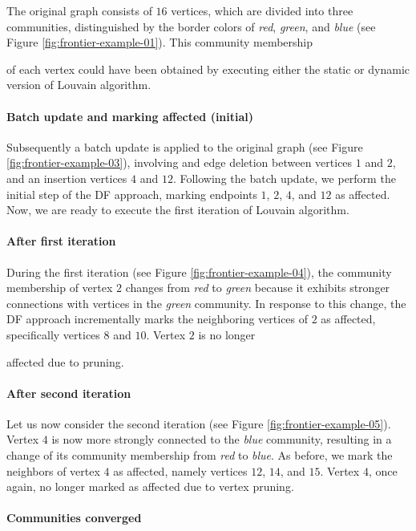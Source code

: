 The original graph consists of $16$ vertices, which are divided into three communities, distinguished by the border colors of \textit{red}, \textit{green}, and \textit{blue} (see Figure \ref{fig:frontier-example-01}). This community membership of each vertex could have been obtained by executing either the static or dynamic version of Louvain algorithm.

\paragraph{Batch update and marking affected (initial)}

Subsequently a batch update is applied to the original graph (see Figure \ref{fig:frontier-example-03}), involving and edge deletion between vertices $1$ and $2$, and an insertion vertices $4$ and $12$. Following the batch update, we perform the initial step of the DF approach, marking endpoints $1$, $2$, $4$, and $12$ as affected. Now, we are ready to execute the first iteration of Louvain algorithm.

\paragraph{After first iteration}

During the first iteration (see Figure \ref{fig:frontier-example-04}), the community membership of vertex $2$ changes from \textit{red} to \textit{green} because it exhibits stronger connections with vertices in the \textit{green} community. In response to this change, the DF approach incrementally marks the neighboring vertices of $2$ as affected, specifically vertices $8$ and $10$. Vertex $2$ is no longer affected due to pruning.

\paragraph{After second iteration}

Let us now consider the second iteration (see Figure \ref{fig:frontier-example-05}). Vertex $4$ is now more strongly connected to the \textit{blue} community, resulting in a change of its community membership from \textit{red} to \textit{blue}. As before, we mark the neighbors of vertex $4$ as affected, namely vertices $12$, $14$, and $15$. Vertex $4$, once again, no longer marked as affected due to vertex pruning.

\paragraph{Communities converged}

